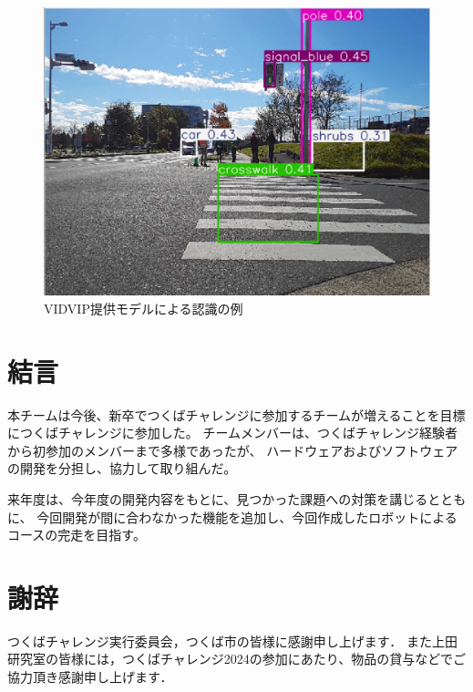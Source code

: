 \documentclass[twocolumn,9pt]{jsproceedings}
\begin{document}
\begin{figure}[h]
  \begin{center}
    \includegraphics[width=0.6\linewidth]{figs/result_of_yolo.pdf}
    \caption{VIDVIP提供モデルによる認識の例}
    \label{fig:result_yolo}
  \end{center}
\end{figure}
\section{結言}
本チームは今後、新卒でつくばチャレンジに参加するチームが増えることを目標につくばチャレンジに参加した。
チームメンバーは、つくばチャレンジ経験者から初参加のメンバーまで多様であったが、
ハードウェアおよびソフトウェアの開発を分担し、協力して取り組んだ。

来年度は、今年度の開発内容をもとに、見つかった課題への対策を講じるとともに、
今回開発が間に合わなかった機能を追加し、今回作成したロボットによるコースの完走を目指す。


\section*{謝辞}
つくばチャレンジ実行委員会，つくば市の皆様に感謝申し上げます．
また上田研究室の皆様には，つくばチャレンジ2024の参加にあたり、物品の貸与などでご協力頂き感謝申し上げます．
\end{document}
